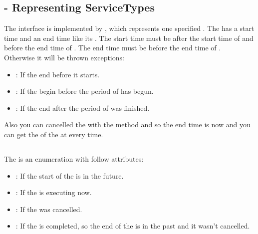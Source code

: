 \subsection{ - Representing ServiceTypes}
The interface  is implemented by , which represents one specified . The  has a 
start time and an end time like its . The start time must be after the start time of  and before the end time of 
. The end time must be before the end time of .\\
Otherwise it will be thrown exceptions:
\begin{itemize}
\item {}: If the  end before it starts.
\item {}: If the  begin before the period of  has begun.
\item {}: If the  end after the period of  was finished.
\end{itemize}
Also you can cancelled the  with the method  and so the end time is now and you can get the 
 of the  at every time.
  
\subsection{}
The  is an enumeration with follow attributes:
\begin{itemize}
\item {}: If the start of the  is in the future.
\item {}: If the  is executing now.
\item {}: If the  was cancelled.
\item {}: If the  is completed, so the end of the  is in the past and it wasn’t cancelled.
\end{itemize}

